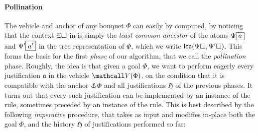 
\paragraph{Pollination}

The vehicle and anchor of any bouquet $\Phi$ can easily by computed, by noticing
that the context $\Xi\square$ in  is simply the \emph{least
common ancestor} of the atoms $\Psi\fbox{$a$}$ and $\Psi'\fbox{$a'$}$ in the
tree representation of $\Phi$, which we write $\mathsf{lca}(\Psi\square,\Psi'\square)$.
This forms the basis for the first \emph{phase} of our algorithm, that we call
the \emph{pollination} phase. Roughly, the idea
is that given a goal $\Phi$, we want to perform eagerly every justification
$\mathfrak{a}$ in the vehicle $\vehicle{\Phi}$, on the condition that it is
compatible with the anchor $\anchor{\Phi}$ and all justifications $\mathfrak{H}$
of the previous phases. It turns out that every such justification can be
implemented by an instance of the  rule, sometimes preceded by an
instance of the  rule. This is best described by the following
\emph{imperative} procedure, that takes as input and modifies in-place both the
goal $\Phi$, and the history $\mathfrak{H}$ of justifications performed so far:

\DontPrintSemicolon

